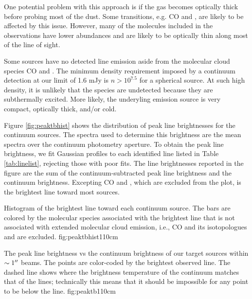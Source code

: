 \documentclass{aa}
\begin{document}
One potential problem with this approach is if the gas becomes optically thick
before probing most of the dust.  Some transitions, e.g. CO and \formaldehyde,
are likely to be affected by this issue.  However, many of the molecules
included in the observations have lower abundances and are likely to be
optically thin along most of the line of sight.

Some sources have no detected line emission aside from the molecular cloud
species CO and \formaldehyde.  The minimum density requirement imposed by a
continuum detection at our limit of 1.6 mJy is $n>10^{7.5}$ \percc for a
spherical source.  At such high density, it is unlikely that the species are
undetected because they are subthermally excited.  More likely, the underyling
emission source is very compact, optically thick, and/or cold.

Figure \ref{fig:peaktbhist} shows the distribution of peak line brightnesses
for the continuum sources.  The spectra used to determine this brightness are
the mean spectra over the continuum photometry aperture.  To obtain the peak
line brightness, we fit Gaussian profiles to each identified line listed in
Table \ref{tab:linelist}, rejecting those with poor fits.  The line
brightnesses reported in the figure are the sum of the continuum-subtracted
peak line brightness and the continuum brightness.  Excepting CO and
\formaldehyde, which are excluded from the plot, \methanol is the brightest
line toward most sources. 

{Histogram of the brightest line toward each continuum source.
The bars are colored by the molecular species associated with the brightest
line that is not associated with extended molecular cloud emission,
i.e., CO and its isotopologues and \formaldehyde are excluded.}
{fig:peaktbhist}{1}{10cm}


{The peak line brightness vs the continuum brightness of our target sources
within $\sim1\mbox{$^{\prime\prime}$}$ beams.  The points are color-coded by the brightest
observed line.  The dashed line shows where the brightness temperature of the
continuum matches that of the lines; technically this means that it should be
impossible for any point to be below the line.  
}
{fig:peaktb}{1}{10cm}
\end{document}
